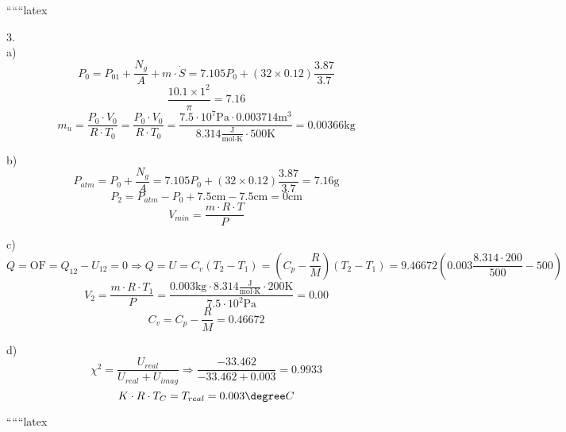 
``````latex


3. \\
a) \\
\[
P_0 = P_{01} + \frac{N_g}{A} + m \cdot \dot{S} = 7.105P_0 + \left(32 \times 0.12 \right) \frac{3.87}{3.7}
\]
\[
\frac{10.1 \times 1^2}{\pi} = 7.16
\]
\[
m_u = \frac{P_0 \cdot V_0}{R \cdot T_0} = \frac{P_0 \cdot V_0}{R \cdot T_0} = \frac{7.5 \cdot 10^7 \text{Pa} \cdot 0.003714 \text{m}^3}{8.314 \frac{\text{J}}{\text{mol} \cdot \text{K}} \cdot 500 \text{K}} = 0.00366 \text{kg}
\]

b) \\
\[
P_{atm} = P_0 + \frac{N_g}{A} = 7.105P_0 + \left(32 \times 0.12 \right) \frac{3.87}{3.7} = 7.16 \text{g}
\]
\[
P_2 = P_{atm} - P_0 + 7.5 \text{cm} - 7.5 \text{cm} = 0 \text{cm}
\]
\[
V_{min} = \frac{m \cdot R \cdot T}{P}
\]

c) \\
\[
Q = \text{OF} = Q_{12} - U_{12} = 0 \Rightarrow Q = U = C_v (T_2 - T_1) = (C_p - \frac{R}{M}) (T_2 - T_1) = 9.46672 \left(0.003 \frac{8.314 \cdot 200}{500} - 500 \right)
\]
\[
V_2 = \frac{m \cdot R \cdot T_1}{P} = \frac{0.003 \text{kg} \cdot 8.314 \frac{\text{J}}{\text{mol} \cdot \text{K}} \cdot 200 \text{K}}{7.5 \cdot 10^2 \text{Pa}} = 0.00
\]
\[
C_v = C_p - \frac{R}{M} = 0.46672
\]

d) \\
\[
\chi^2 = \frac{U_{real}}{U_{real} + U_{imag}} \Rightarrow \frac{-33.462}{-33.462 + 0.003} = 0.9933
\]
\[
K \cdot R \cdot T_C = T_{real} = 0.003 \degree C
\]

``````latex


